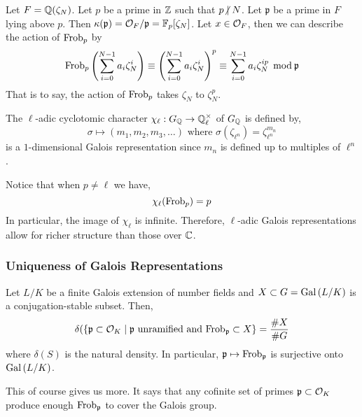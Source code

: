 \documentclass[12pt]{article}
\begin{document}
\begin{lemma}
Let $F = \mathbb{Q}(\zeta_N)$. Let $p$ be a prime in $\mathbb{Z}$ such that $p \ndivides N$. Let $\mathfrak{p}$ be a prime in $F$ lying above $p$. Then $\kappa(\mathfrak{p}) = \mathcal{O}_{F} / \mathfrak{p} = \mathbb{F}_p[\zeta_N]$. 
Let $x \in \mathcal{O}_{F}$, then we can describe the action of $\mathrm{Frob}_p$ by 
\[ \mathrm{Frob}_p\left( \sum_{i = 0}^{N-1} a_i \zeta_N^i \right) \equiv \left( \sum_{i = 0}^{N-1} a_i \zeta_N^i \right)^p \equiv \sum_{i = 0}^{N-1} a_i \zeta_N^{ip} \: \: \mathrm{mod} \: \mathfrak{p} \]
That is to say, the action of $\mathrm{Frob}_p$ takes $\zeta_N$ to $\zeta_N^p$.
\end{lemma}

\begin{definition}
The $\ell$-adic cyclotomic character $\chi_{\ell} : G_{\mathbb{Q}} \to \mathbb{Q}_{\ell}^\times$ of $G_{\mathbb{Q}}$ is defined by, 
\[ \sigma \mapsto (m_1, m_2, m_3, \dots ) \text{ where } \sigma(\zeta_{\ell^n}) = \zeta_{\ell^n}^{m_n} \]
is a $1$-dimensional Galois representation since $m_n$ is defined up to multiples of $\ell^n$.
\end{definition}

\begin{remark}
Notice that when $p \neq \ell$ we have,
\[\chi_{\ell}(\mathrm{Frob}_p) = p\]
In particular, the image of $\chi_{\ell}$ is infinite. Therefore, $\ell$-adic Galois representations allow for richer structure than those over $\mathbb{C}$. 
\end{remark}

\subsubsection{Uniqueness of Galois Representations}

\begin{thm}[Chebotarev]
Let $L/K$ be a finite Galois extension of number fields and $X \subset G = \mathrm{Gal}\left( L/K \right)$ is a conjugation-stable subset. Then,
\[ \delta(\{ \mathfrak{p} \subset \mathcal{O}_{K} \mid \mathfrak{p} \text{ unramified and } \mathrm{Frob}_{\mathfrak{p}} \subset X \} = \frac{\# X}{\# G} \]
where $\delta(S)$ is the natural density. In particular, $\mathfrak{p} \mapsto \mathrm{Frob}_{\mathfrak{p}}$ is surjective onto $\mathrm{Gal}\left( L/K \right)$.
\end{thm}

\begin{rmk}
This of course gives us more. It says that any cofinite set of primes $\mathfrak{p} \subset \mathcal{O}_{K}$ produce enough $\mathrm{Frob}_{\mathfrak{p}}$ to cover the Galois group.
\end{rmk}
\end{document}

